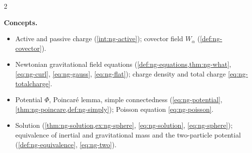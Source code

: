 \begin{paracol}{2}
\begin{keyconcepts}
\begin{enumerate}
\end{enumerate}
\textbf{Concepts.}
\begin{itemize}
  \item Active and passive charge (\cref{int:ng-active}); covector field $W_\alpha$ (\cref{def:ng-covector}).
  \item Newtonian gravitational field equations (\cref{def:ng-equations,thm:ng-what}, \eqref{eq:ng-curl}, \eqref{eq:ng-gauss}, \eqref{eq:ng-flat}); charge density and total charge \eqref{eq:ng-totalcharge}.
  \item Potential $\Phi$, Poincar\'e lemma, simple connectedness (\eqref{eq:ng-potential}, \cref{thm:ng-poincare,def:ng-simply}); Poisson equation \eqref{eq:ng-poisson}.
  \item Solution (\cref{thm:ng-solution,ex:ng-sphere}, \eqref{eq:ng-solution}, \eqref{eq:ng-sphere}); equivalence of inertial and gravitational mass and the two-particle potential (\cref{def:ng-equivalence}, \eqref{eq:ng-two}).
\end{itemize}
\end{keyconcepts}

\flushside
\end{paracol}
